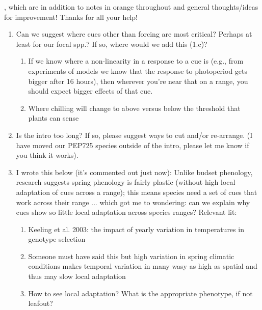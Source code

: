 \documentclass[11pt,letterpaper]{article}
\begin{document}
\newpage
{}, which are in addition to notes in orange throughout and general thoughts/ideas for improvement! Thanks for all your help!
\begin{enumerate}
\item Can we suggest where cues other than forcing are most critical? Perhaps at least for our focal spp.? If so, where would we add this (1.c)?
\begin{enumerate}
\item If we know where a non-linearity in a response to a cue is (e.g., from experiments of models we know that the response to photoperiod gets bigger after 16 hours), then wherever you're near that on a range, you should expect bigger effects of that cue.
\item Where chilling will change to above versus below the threshold that plants can sense %
\end{enumerate}
\item Is the intro too long? If so, please suggest ways to cut and/or re-arrange. (I have moved our PEP725 species outside of the intro, please let me know if you think it works).
\item I wrote this below (it's commented out just now): Unlike budset phenology, research suggests spring phenology is fairly plastic (without high local adaptation of cues across a range); this means species need a set of cues that work across their range ... which got me to wondering: can we explain why cues show so little local adaptation across species ranges? Relevant lit:
\begin{enumerate}
\item Keeling et al. 2003: the impact of yearly variation in temperatures in genotype selection
\item Someone must have said this but high variation in spring climatic conditions makes temporal variation in many wasy as high as spatial and thus may slow local adaptation
\item How to see local adaptation? What is the appropriate phenotype, if not leafout?
\end{enumerate}
\end{enumerate}
\end{document}
